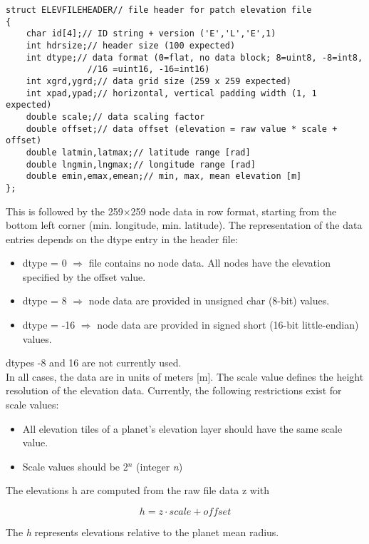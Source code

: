 \documentclass[Orbiter Developer Manual.tex]{subfiles}
\begin{document}
\begin{lstlisting}
struct ELEVFILEHEADER// file header for patch elevation file
{
	char id[4];// ID string + version ('E','L','E',1)
	int hdrsize;// header size (100 expected)
	int dtype;// data format (0=flat, no data block; 8=uint8, -8=int8,
				//16 =uint16, -16=int16)
	int xgrd,ygrd;// data grid size (259 x 259 expected)
	int xpad,ypad;// horizontal, vertical padding width (1, 1 expected)
	double scale;// data scaling factor
	double offset;// data offset (elevation = raw value * scale + offset)
	double latmin,latmax;// latitude range [rad]
	double lngmin,lngmax;// longitude range [rad]
	double emin,emax,emean;// min, max, mean elevation [m]
};
\end{lstlisting}

\noindent
This is followed by the 259×259 node data in row format, starting from the bottom left corner (min. longitude, min. latitude). The representation of the data entries depends on the dtype entry in the header file:

\begin{itemize}
\item dtype = 0 $\Rightarrow$ file contains no node data. All nodes have the elevation specified by the offset value.
\item dtype = 8 $\Rightarrow$ node data are provided in unsigned char (8-bit) values.
\item dtype = -16 $\Rightarrow$ node data are provided in signed short (16-bit little-endian) values.
\end{itemize}

\noindent
dtypes -8 and 16 are not currently used.\\
In all cases, the data are in units of meters [m]. The scale value defines the height resolution of the elevation data. Currently, the following restrictions exist for scale values:

\begin{itemize}
\item All elevation tiles of a planet's elevation layer should have the same scale value.
\item Scale values should be 2$^{n}$ (integer \textit{n})
\end{itemize}

\noindent
The elevations h are computed from the raw file data z with

\[ h = z \cdot scale + offset \]

The \textit{h} represents elevations relative to the planet mean radius.
\end{document}
